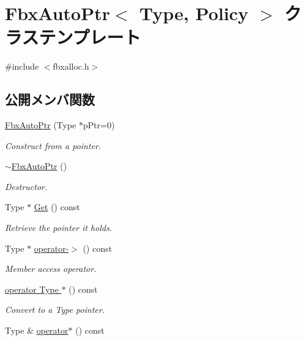 \hypertarget{class_fbx_auto_ptr}{}\section{Fbx\+Auto\+Ptr$<$ Type, Policy $>$ クラステンプレート}
\label{class_fbx_auto_ptr}


{\ttfamily \#include $<$fbxalloc.\+h$>$}

\subsection*{公開メンバ関数}
\begin{DoxyCompactItemize}
\item 
\hyperlink{class_fbx_auto_ptr_ae988d5760ee4926a4a10d76c37b378fc}{Fbx\+Auto\+Ptr} (Type $\ast$p\+Ptr=0)
\begin{DoxyCompactList}\small\item\em Construct from a pointer. \end{DoxyCompactList}\item 
\hyperlink{class_fbx_auto_ptr_aa185a3ac9d0cc7b8c2b04825f3ea73ee}{$\sim$\+Fbx\+Auto\+Ptr} ()
\begin{DoxyCompactList}\small\item\em Destructor. \end{DoxyCompactList}\item 
Type $\ast$ \hyperlink{class_fbx_auto_ptr_ae7006aca39929990a12c7c99af5d3ef7}{Get} () const
\begin{DoxyCompactList}\small\item\em Retrieve the pointer it holds. \end{DoxyCompactList}\item 
Type $\ast$ \hyperlink{class_fbx_auto_ptr_adfc79ea055e3de00252fb707ff5cfe31}{operator-\/$>$} () const
\begin{DoxyCompactList}\small\item\em Member access operator. \end{DoxyCompactList}\item 
\hyperlink{class_fbx_auto_ptr_ab7d5ac9eadc5c51ea062016f08640be1}{operator Type $\ast$} () const
\begin{DoxyCompactList}\small\item\em Convert to a Type pointer. \end{DoxyCompactList}\item 
Type \& \hyperlink{class_fbx_auto_ptr_acb65f0b9499fede18cb2749fa42f40a9}{operator$\ast$} () const

\end{DoxyCompactItemize}

